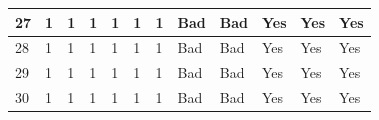\begin{table}[H]
\begin{tabular}{|l|l|l|l|l|l|l|l|l|l|l|l|}
27                                                          & 1  & 1    & 1   & 1     & 1    & 1                                                                     & Bad                                                     & Bad                                                      & Yes                                                                   & Yes                                                                   & Yes                                                                   \\ \hline
28                                                          & 1  & 1    & 1   & 1     & 1    & 1                                                                     & Bad                                                     & Bad                                                      & Yes                                                                   & Yes                                                                   & Yes                                                                   \\ \hline
29                                                          & 1  & 1    & 1   & 1     & 1    & 1                                                                     & Bad                                                     & Bad                                                      & Yes                                                                   & Yes                                                                   & Yes                                                                   \\ \hline
30                                                          & 1  & 1    & 1   & 1     & 1    & 1                                                                     & Bad                                                     & Bad                                                      & Yes                                                                   & Yes                                                                   & Yes                                                                   \\ \hline

\end{tabular}
\end{table}
